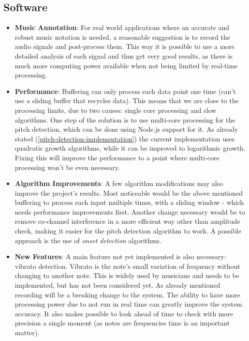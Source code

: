 \subsection{Software}
\begin{itemize}
  \item \textbf{Music Annotation}: For real world applications where an accurate and
  robust music notation is needed, a reasonable suggestion is to record the audio signals and
  post-process them. This way it is possible to use a more detailed analysis
  of each signal and thus get very good results, as there is much more computing
  power available when not being limited by real-time processing.

  \item \textbf{Performance}: Buffering can only
  process each data point one time (can't use a sliding buffer that recycles data).
  This means that we are close to the processing limits, due to two causes: single
  core processing and slow algorithms. 
  One step of the solution is to use multi-core processing for the pitch detection,
  which can be done using Node.js support for it. 
  As already stated (\autoref{pitch-detection-implementation}) the current implementation
  uses quadratic growth algorithms, while it can be improved to logarithmic
  growth. Fixing this will improve the performance to a point where multi-core processing
  won't be even necessary.

  \item \textbf{Algorithm Improvements}: A few algorithm modifications may also improve the project's results. Most noticeable
  would be the above mentioned buffering to process each input multiple times, with a
  sliding window - which needs performance improvements first.
  Another change necessary would be to remove co-channel interference in a more efficient
  way other than amplitude check, making it easier for the pitch detection algorithm to work.
  A possible approach is the use of \textit{onset detection} algorithms.
  
  \item \textbf{New Features}: A main feature not yet implemented is also necessary: vibrato detection. Vibrato is the
  note's small variation of frequency without changing to another note. This is widely used
  by musicians and needs to be implemented, but has not been considered yet.
  As already mentioned recording will be a breaking change to the system. The ability to have
  more processing power due to not run in real time can greatly improve the system accuracy.
  It also makes possible to look ahead of time to check with more precision a single moment
  (as notes are frequencies time is an important matter).  
\end{itemize}
